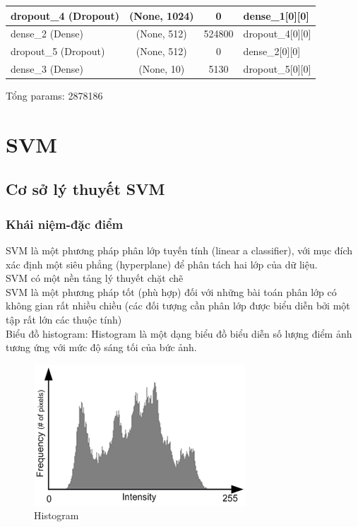 \documentclass[a4paper,12pt]{report}
\begin{document}
{\begin{center}
\begin{longtable}{lccl}
\hline
dropout\_4 (Dropout)  &            (None, 1024)  &        0  &         dense\_1[0][0]      \\              
\hline
dense\_2 (Dense)       &           (None, 512)  &         524800&      dropout\_4[0][0]        \\          

\hline
dropout\_5 (Dropout)    &          (None, 512) &          0      &     dense\_2[0][0]        \\           

\hline
dense\_3 (Dense)         &         (None, 10) &           5130    &    dropout\_5[0][0]          \\        

\hline
\end{longtable} 
\end{center}
}
Tổng params: 2878186
\section{SVM}
\subsection{Cơ sở lý thuyết SVM}
\subsubsection{Khái niệm-đặc điểm  }
SVM là một phương pháp phân lớp tuyến tính (linear a 
classifier), với mục đích xác định một siêu phẳng
(hyperplane) để phân tách hai lớp của dữ liệu.\\
SVM có một nền tảng lý thuyết chặt chẽ\\
SVM là một phương pháp tốt (phù hợp) đối với những bài
toán phân lớp có không gian rất nhiều chiều (các đối
tượng cần phân lớp được biểu diễn bởi một tập rất lớn
các thuộc tính)\\

Biểu đồ histogram:
Histogram là một dạng biểu đồ biểu diễn số lượng điểm ảnh tương ứng với mức độ sáng tối của bức ảnh.\\
\begin{figure}[H]
\centering
\includegraphics[scale=0.9]{histogram.png}
\caption{Histogram}
\label{fig:histogram}
\end{figure}
\end{document}
